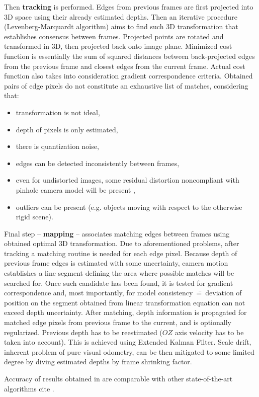 Then \textbf{tracking} is performed. Edges from previous frames are first projected into 3D space using their already estimated depths. Then an iterative procedure (Levenberg-Marquardt algorithm) aims to find such 3D transformation that establishes consensus between frames. Projected points are rotated and transformed in 3D, then projected back onto image plane. Minimized cost function is essentially the sum of squared distances between back-projected edges from the previous frame and closest edges from the current frame. Actual cost function also takes into consideration gradient correspondence criteria. Obtained pairs of edge pixels do not constitute an exhaustive list of matches, considering that:
\begin{itemize}
\item transformation is not ideal,
\item depth of pixels is only estimated,
\item there is quantization noise,
\item edges can be detected inconsistently between frames,
\item even for undistorted images, some residual distortion noncompliant with pinhole camera model will be present \cite{barreto2007non},
\item outliers can be present (e.g. objects moving with respect to the otherwise rigid scene).
\end{itemize}
 
Final step -- \textbf{mapping} -- associates matching edges between frames using obtained optimal 3D transformation. Due to aforementioned problems, after tracking a matching routine is needed for each edge pixel. Because depth of previous frame edges is estimated with some uncertainty, camera motion establishes a line segment defining the area where possible matches will be searched for. Once such candidate has been found, it is tested for gradient correspondence and, most importantly, for model consistency~\==~deviation of position on the segment obtained from linear transformation equation can not exceed depth uncertainty. After matching, depth information is propagated for matched edge pixels from previous frame to the current, and is optionally regularized. Previous depth has to be reestimated ($OZ$ axis velocity has to be taken into account). This is achieved using Extended Kalman Filter. Scale drift, inherent problem of pure visual odometry, can be then mitigated to some limited degree by diving estimated depths by frame shrinking factor.

Accuracy of results obtained in \cite{jose2015realtime} are comparable with other state-of-the-art algorithms cite \cite{yang2017direct}.


